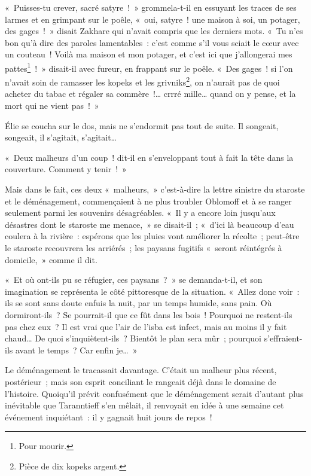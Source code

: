 \documentclass[french,twoside]{book} %
\begin{document}
« Puisses-tu crever, sacré satyre ! » grommela-t-il en essuyant les traces de ses larmes et en grimpant sur le poêle, « oui, satyre ! une maison à soi, un potager, des gages ! » disait Zakhare qui n’avait compris que les derniers mots. « Tu n’es bon qu’à dire des paroles lamentables : c’est comme s’il vous sciait le cœur avec un couteau ! Voilà ma maison et mon potager, et c’est ici que j’allongerai mes pattes\footnote{Pour mourir.} ! » disait-il avec fureur, en frappant sur le poêle. « Des gages ! si l’on n’avait soin de ramasser les kopeks et les grivniks\footnote{Pièce de dix kopeks argent.}, on n’aurait pas de quoi acheter du tabac et régaler sa commère !… crrré mille… quand on y pense, et la mort qui ne vient pas ! »\par
Élie se coucha sur le dos, mais ne s’endormit pas tout de suite. Il songeait, songeait, il s’agitait, s’agitait…\par
« Deux malheurs d’un coup ! dit-il en s’enveloppant tout à fait la tête dans la couverture. Comment y tenir ! »\par
Mais dans le fait, ces deux « malheurs, » c’est-à-dire la lettre sinistre du staroste et le déménagement, commençaient à ne plus troubler Oblomoff et à se ranger seulement parmi les souvenirs désagréables. « Il y a encore loin jusqu’aux désastres dont le staroste me menace, » se disait-il ; « d’ici là beaucoup d’eau coulera à la rivière : espérons que les pluies vont améliorer la récolte ; peut-être le staroste recouvrera les arriérés ; les paysans fugitifs « seront réintégrés à domicile, » comme il dit.\par
« Et où ont-ils pu se réfugier, ces paysans ? » se demanda-t-il, et son imagination se représenta le côté pittoresque de la situation. « Allez donc voir : ils se sont sans doute enfuis la nuit, par un temps humide, sans pain. Où dormiront-ils ? Se pourrait-il que ce fût dans les bois ! Pourquoi ne restent-ils pas chez eux ? Il est vrai que l’air de l’isba est infect, mais au moins il y fait chaud… De quoi s’inquiètent-ils ? Bientôt le plan sera mûr ; pourquoi s’effraient-ils avant le temps ? Car enfin je… »\par
Le déménagement le tracassait davantage. C’était un malheur plus récent, postérieur ; mais son esprit conciliant le rangeait déjà dans le domaine de l’histoire. Quoiqu’il prévit confusément que le déménagement serait d’autant plus inévitable que Taranntieff s’en mêlait, il renvoyait en idée à une semaine cet événement inquiétant : il y gagnait huit jours de repos !\par
\end{document}
